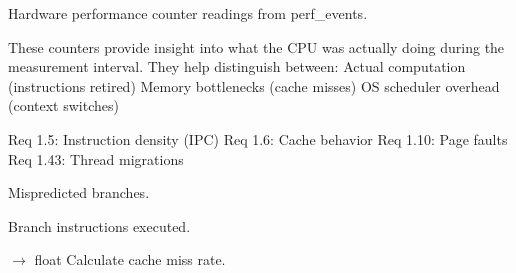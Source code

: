 \documentclass[letterpaper,10pt,english]{sphinxmanual}
\begin{document}
\begin{fulllineitems}
\sphinxAtStartPar
Hardware performance counter readings from perf\_events.

\sphinxAtStartPar
These counters provide insight into what the CPU was actually doing
during the measurement interval. They help distinguish between:
\sphinxhyphen{} Actual computation (instructions retired)
\sphinxhyphen{} Memory bottlenecks (cache misses)
\sphinxhyphen{} OS scheduler overhead (context switches)

\sphinxAtStartPar
Req 1.5: Instruction density (IPC)
Req 1.6: Cache behavior
Req 1.10: Page faults
Req 1.43: Thread migrations

\begin{fulllineitems}
\label{\detokenize{core.models.performance_counters:core.models.performance_counters.PerformanceCounters.branch_misses}}
\pysigstartsignatures
\pysigline
{}
\pysigstopsignatures
\sphinxAtStartPar
Mispredicted branches.

\end{fulllineitems}


\begin{fulllineitems}
\label{\detokenize{core.models.performance_counters:core.models.performance_counters.PerformanceCounters.branches}}
\pysigstartsignatures
\pysigline
{}
\pysigstopsignatures
\sphinxAtStartPar
Branch instructions executed.

\end{fulllineitems}


\begin{fulllineitems}
\label{\detokenize{core.models.performance_counters:core.models.performance_counters.PerformanceCounters.cache_miss_rate}}
\pysigstartsignatures
\pysiglinewithargsret
{}
{}
{{ $\rightarrow$ float}}
\pysigstopsignatures
\sphinxAtStartPar
Calculate cache miss rate.


\end{fulllineitems}
\end{fulllineitems}
\end{document}
